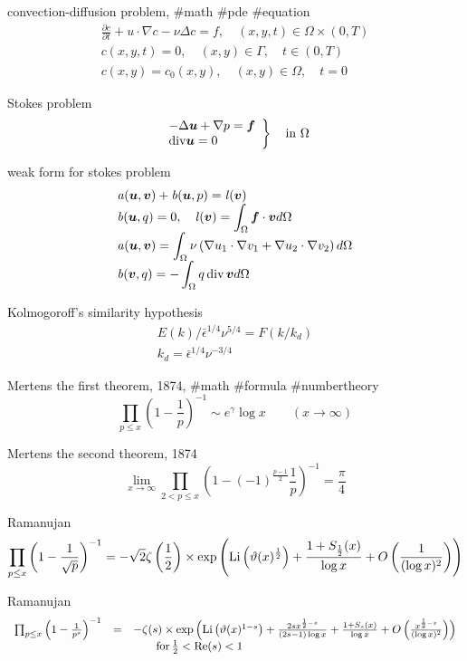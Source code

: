 convection-diffusion problem, #math #pde #equation
$$
\begin{array}{l}
\frac{\partial c}{\partial t}+u\cdot\nabla c-\nu\Delta c=f, \quad (x,y,t)\in\Omega\times(0,T) \\
c(x,y,t)=0, \quad (x,y)\in\Gamma,\quad t\in (0,T) \\
c(x,y)=c_0(x,y), \quad (x,y)\in\Omega, \quad t=0
\end{array}
$$

Stokes problem
$$
\left.
\begin{array}{l}
-\Delta {\boldsymbol u}+\nabla p={\boldsymbol f} \\
{\rm div}{\boldsymbol u}=0
\end{array}
\right\}
\quad {\rm in}\,\, \Omega
$$

weak form for stokes problem
$$
\begin{array}{l}
{\it a}({\boldsymbol u},{\boldsymbol v})+{\it b}({\boldsymbol u},p)={\it l}({\boldsymbol v}) \\
{\it b}({\boldsymbol u},q)=0, \quad {\it l}({\boldsymbol v})=\displaystyle \int_\Omega {\boldsymbol f}\cdot {\boldsymbol v}d\Omega \\
{\it a}({\boldsymbol u},{\boldsymbol v})=\displaystyle \int_\Omega \nu\left(\nabla u_1\cdot\nabla v_1+\nabla u_2\cdot\nabla v_2\right)d\Omega \\
{\it b}({\boldsymbol v},q)=-\displaystyle \int_\Omega q \,{\rm div}\,{\boldsymbol v}d\Omega
\end{array}
$$

Kolmogoroff's similarity hypothesis
$$
\begin{array}{r}
E(k)/\bar{\epsilon}^{1/4}\nu^{5/4}=F(k/k_d)\\
k_d=\bar{\epsilon}^{1/4}\nu^{-3/4}
\end{array}
$$

Mertens the first theorem, 1874, #math #formula #numbertheory 
$$
\prod_{p\le x}\left(1-\frac{1}{p}\right)^{-1} \sim e^\gamma \log x \qquad (x\rightarrow\infty)
$$

Mertens the second theorem, 1874
$$
\lim_{x\rightarrow\infty}\prod_{2<p\le x}\left(1-(-1)^{\frac{p-1}{2}}\frac{1}{p}\right)^{-1} =\frac{\pi}{4}
$$

Ramanujan
$$
\prod_{p\le x}\left(1-\frac{1}{\sqrt{p}}\right)^{-1} =-\sqrt{2}\zeta\left(\frac{1}{2}\right)\times\exp\left({\rm Li}\left(\vartheta(x)^{\frac{1}{2}}\right)+\frac{1+S_{\frac{1}{2}}(x)}{\log x}+O\left(\frac{1}{(\log x)^2}\right)\right)
$$

Ramanujan
$$
\begin{array}{lll}
\prod_{p\le x}\left(1-\frac{1}{p^s}\right)^{-1} &=&-\zeta(s)\times\exp\left({\rm Li}\left(\vartheta(x)^{1-s}\right)+\frac{2sx^{\frac{1}{2}-s}}{(2s-1)\log x}+\frac{1+S_s(x)}{\log x}+O\left(\frac{x^{\frac{1}{2}-s}}{(\log x)^2}\right)\right) \\
&& \qquad {\rm for}\,\frac{1}{2}<{\rm Re}(s)<1
\end{array}
$$

